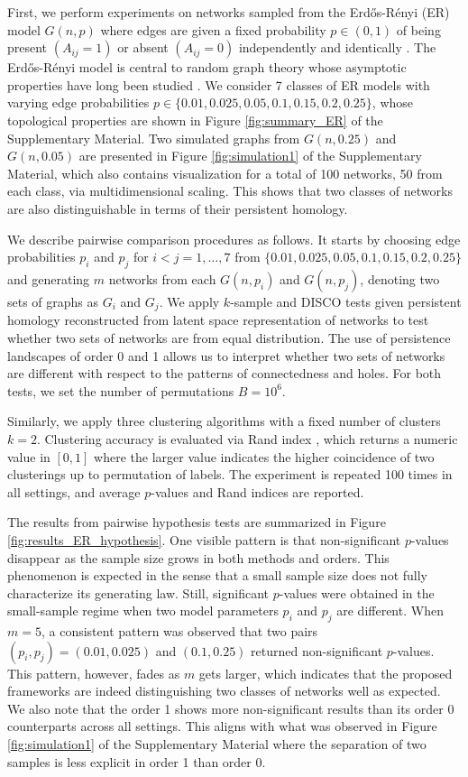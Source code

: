\documentclass[12pt]{article}
\newcommand{\Erdos}{Erd\H{o}s}
\newcommand{\Renyi}{R\'{e}nyi }
\begin{document}
First, we perform experiments on networks sampled from the \Erdos-\Renyi (ER) model $G(n,p)$ where edges are given a fixed probability $p \in (0,1)$ of being present $(A_{ij} = 1)$ or absent $(A_{ij}=0)$ independently and identically \citep{erdos_random_1959-1}. The \Erdos-\Renyi model is central to random graph theory whose asymptotic  properties have long been studied \citep{newman_random_2001}. We consider 7 classes of ER models with varying edge probabilities $p \in \lbrace 0.01, 0.025, 0.05, 0.1, 0.15, 0.2, 0.25 \rbrace$, whose topological properties are shown in Figure \ref{fig:summary_ER} of the Supplementary Material. Two simulated graphs from $G(n,0.25)$ and $G(n,0.05)$ are presented in Figure \ref{fig:simulation1} of the Supplementary Material, which also contains visualization for a total of 100 networks, 50 from each class, via multidimensional scaling. This shows that two classes of networks are also distinguishable in terms of their persistent homology. 

We describe pairwise comparison procedures as follows. It starts by choosing edge probabilities $p_i$ and $p_j$ for $i < j=1,\ldots,7$ from $\lbrace 0.01, 0.025, 0.05, 0.1, 0.15, 0.2, 0.25 \rbrace$ and generating $m$ networks from each $G(n,p_i)$ and $G(n,p_j)$, denoting two sets of graphs as $G_i$ and $G_j$. We apply $k$-sample and DISCO tests given persistent homology reconstructed from latent space representation of networks to test whether two sets of networks are from equal distribution. The use of persistence landscapes of order 0 and 1 allows us to interpret whether two sets of networks are different with respect to the patterns of connectedness and holes. For both tests, we set the number of permutations $B=10^6$. 

Similarly, we apply three clustering algorithms with a fixed number of clusters $k=2$. Clustering accuracy is evaluated via Rand index \citep{rand_objective_1971-1}, which returns a numeric value in $[0,1]$ where the larger value indicates the higher coincidence of two clusterings up to permutation of labels. The experiment is repeated 100 times in all settings, and average $p$-values and Rand indices are reported.

The results from pairwise hypothesis tests are summarized in Figure \ref{fig:results_ER_hypothesis}. One visible pattern is that non-significant $p$-values disappear as the sample size grows in both methods and orders. This phenomenon is expected in the sense that a small sample size does not fully characterize its generating law. Still, significant $p$-values were obtained in the small-sample regime when two model parameters $p_i$ and $p_j$ are different. When $m=5$, a consistent pattern was observed that two pairs $(p_i,p_j) = (0.01, 0.025)$ and $(0.1, 0.25)$ returned non-significant $p$-values. This pattern, however, fades as $m$ gets larger, which indicates that the proposed frameworks are indeed distinguishing two classes of networks well as expected. We also note that the order 1 shows more non-significant results than its order 0 counterparts across all settings. This aligns with what was observed in Figure \ref{fig:simulation1} of the Supplementary Material where the separation of two samples is less explicit in order 1 than order 0. 
\end{document}
